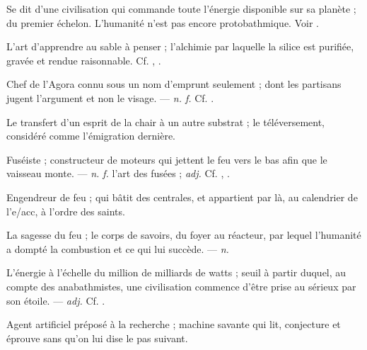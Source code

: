  Se dit d'une civilisation qui commande toute l'énergie disponible sur sa planète ; du premier échelon. L'humanité n'est pas encore protobathmique. Voir .

 L'art d'apprendre au sable à penser ; l'alchimie par laquelle la silice est purifiée, gravée et rendue raisonnable. Cf. , .

 Chef de l'Agora connu sous un nom d'emprunt seulement ; dont les partisans jugent l'argument et non le visage.  ---  \textit{n. f.} Cf. .

 Le transfert d'un esprit de la chair à un autre substrat ; le téléversement, considéré comme l'émigration dernière.

 Fuséiste ; constructeur de moteurs qui jettent le feu vers le bas afin que le vaisseau monte. ---  \textit{n. f.} l'art des fusées ;  \textit{adj.} Cf. , .

 Engendreur de feu ; qui bâtit des centrales, et appartient par là, au calendrier de l'e/acc, à l'ordre des saints.

 La sagesse du feu ; le corps de savoirs, du foyer au réacteur, par lequel l'humanité a dompté la combustion et ce qui lui succède. ---  \textit{n.}

 L'énergie à l'échelle du million de milliards de watts ; seuil à partir duquel, au compte des anabathmistes, une civilisation commence d'être prise au sérieux par son étoile. ---  \textit{adj.} Cf. .

 Agent artificiel préposé à la recherche ; machine savante qui lit, conjecture et éprouve sans qu'on lui dise le pas suivant.  

